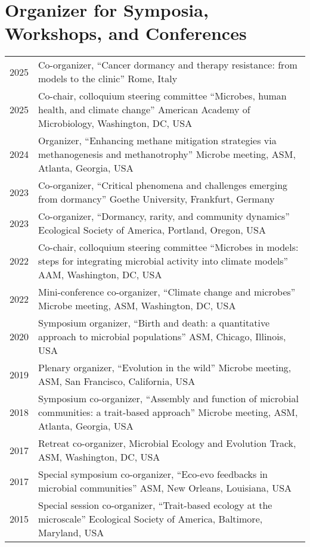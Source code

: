 \documentclass[11pt]{article}
\begin{document}
\section*{Organizer for Symposia, Workshops, and Conferences}
\vspace{-1.25em} %
\noindent
\begin{longtable}{@{}p{3em}@{\hspace{1.5em}}p{}@{}}

2025 & Co-organizer, “Cancer dormancy and therapy resistance: from models to the clinic” Rome, Italy \\
2025 & Co-chair, colloquium steering committee “Microbes, human health, and climate change” American Academy of Microbiology, Washington, DC, USA \\
2024 & Organizer, “Enhancing methane mitigation strategies via methanogenesis and methanotrophy” Microbe meeting, ASM, Atlanta, Georgia, USA \\
2023 & Co-organizer, “Critical phenomena and challenges emerging from dormancy” Goethe University, Frankfurt, Germany \\
2023 & Co-organizer, “Dormancy, rarity, and community dynamics” Ecological Society of America, Portland, Oregon, USA \\
2022 & Co-chair, colloquium steering committee “Microbes in models: steps for integrating microbial activity into climate models” AAM, Washington, DC, USA \\
2022 & Mini-conference co-organizer, “Climate change and microbes” Microbe meeting, ASM, Washington, DC, USA \\
2020 & Symposium organizer, “Birth and death: a quantitative approach to microbial populations” ASM, Chicago, Illinois, USA \\
2019 & Plenary organizer, “Evolution in the wild” Microbe meeting, ASM, San Francisco, California, USA \\
2018 & Symposium co-organizer, “Assembly and function of microbial communities: a trait-based approach” Microbe meeting, ASM, Atlanta, Georgia, USA \\
2017 & Retreat co-organizer, Microbial Ecology and Evolution Track, ASM, Washington, DC, USA \\
2017 & Special symposium co-organizer, “Eco-evo feedbacks in microbial communities” ASM, New Orleans, Louisiana, USA \\
2015 & Special session co-organizer, “Trait-based ecology at the microscale” Ecological Society of America, Baltimore, Maryland, USA \\

\end{longtable}
\end{document}
